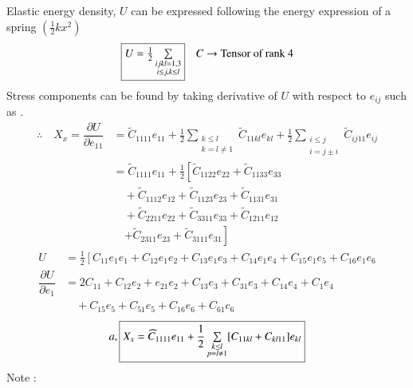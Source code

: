 Elastic energy density, $U$ can be expressed following the energy expression of a spring $(\frac{1}{2}kx^{2})$
$$
\fbox{$U=\frac{1}{2}\sum\limits_{\substack{ijkl=1,3\\ i\leq j,k\leq l}}$}\quad C\to \text{Tensor of rank 4}
$$
Stress components can be found by taking derivative of $U$ with respect to $e_{ij}$ such as .
\begin{align*}
\therefore\quad X_{x}=\dfrac{\partial U}{\partial e_{11}} &= \widetilde{C}_{1111}e_{11}+\frac{1}{2}\sum\limits_{\substack{k\leq l\\ k=l\neq 1}}\widetilde{C}_{11kl}e_{kl}+\frac{1}{2}\sum\limits_{\substack{i\leq j\\ i=j\pm i}}\widetilde{C}_{ij11}e_{ij}\\
&= \widetilde{C}_{1111}e_{11}+\frac{1}{2}\left[\widetilde{C}_{1122}e_{22}+\widetilde{C}_{1133}e_{33}\right.\\
&\quad +\widetilde{C}_{1112}e_{12}+\widetilde{C}_{1123}e_{23}+\widetilde{C}_{1131}e_{31}\\
&\quad +\widetilde{C}_{2211}e_{22}+\widetilde{C}_{3311}e_{33}+\widetilde{C}_{1211}e_{12}\\
&\quad \left.+\widetilde{C}_{2311}e_{23}+\widetilde{C}_{3111}e_{31}\right]
\end{align*}
\begin{align*}
U &=\frac{1}{2}\left[C_{11}e_{1}e_{1}+C_{12}e_{1}e_{2}+C_{13}e_{1}e_{3}+C_{14}e_{1}e_{4}+C_{15}e_{1}e_{5}+C_{16}e_{1}e_{6}\right.\\
\dfrac{\partial U}{\partial e_{1}} &= 2C_{11}+C_{12}e_{2}+e_{21}e_{2}+C_{13}e_{3}+C_{31}e_{3}+C_{14}e_{4}+C_{1}e_{4}\\
&\quad +C_{15}e_{5}+C_{51}e_{5}+C_{16}e_{6}+C_{61}c_{6}
\end{align*}
$$
a, \fbox{$X_{x}=\widehat{C}_{1111}e_{11}+\dfrac{1}{2}\sum\limits_{\substack{k\leq l\\ p=l\neq 1}}[C_{11kl}+C_{kl11}]e_{kl}$}
$$
Note : %
